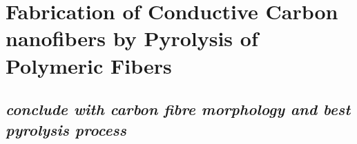 
\chapter{Fabrication of Conductive Carbon nanofibers by Pyrolysis of Polymeric Fibers} %

\label{Chapter:6}

\section{}



\section{\emph{conclude with carbon fibre morphology and best pyrolysis process}}
